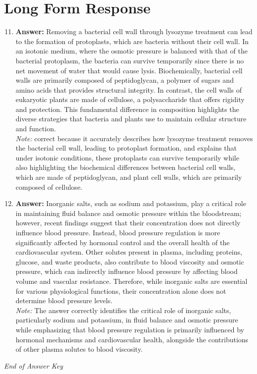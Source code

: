 \documentclass[12pt]{article}
\begin{document}
\section*{Long Form Response}
\begin{enumerate}[label=\arabic*.]
\setcounter{enumi}{10}
\item \textbf{Answer:} Removing a bacterial cell wall through lysozyme treatment can lead to the formation of protoplasts, which are bacteria without their cell wall. In an isotonic medium, where the osmotic pressure is balanced with that of the bacterial protoplasm, the bacteria can survive temporarily since there is no net movement of water that would cause lysis. Biochemically, bacterial cell walls are primarily composed of peptidoglycan, a polymer of sugars and amino acids that provides structural integrity. In contrast, the cell walls of eukaryotic plants are made of cellulose, a polysaccharide that offers rigidity and protection. This fundamental difference in composition highlights the diverse strategies that bacteria and plants use to maintain cellular structure and function.
\\ \textit{Note:} correct because it accurately describes how lysozyme treatment removes the bacterial cell wall, leading to protoplast formation, and explains that under isotonic conditions, these protoplasts can survive temporarily while also highlighting the biochemical differences between bacterial cell walls, which are made of peptidoglycan, and plant cell walls, which are primarily composed of cellulose.
\item \textbf{Answer:} Inorganic salts, such as sodium and potassium, play a critical role in maintaining fluid balance and osmotic pressure within the bloodstream; however, recent findings suggest that their concentration does not directly influence blood pressure. Instead, blood pressure regulation is more significantly affected by hormonal control and the overall health of the cardiovascular system. Other solutes present in plasma, including proteins, glucose, and waste products, also contribute to blood viscosity and osmotic pressure, which can indirectly influence blood pressure by affecting blood volume and vascular resistance. Therefore, while inorganic salts are essential for various physiological functions, their concentration alone does not determine blood pressure levels.
\\ \textit{Note:} The answer correctly identifies the critical role of inorganic salts, particularly sodium and potassium, in fluid balance and osmotic pressure while emphasizing that blood pressure regulation is primarily influenced by hormonal mechanisms and cardiovascular health, alongside the contributions of other plasma solutes to blood viscosity.
\end{enumerate}

\vfill
\noindent\textit{End of Answer Key}
\end{document}
